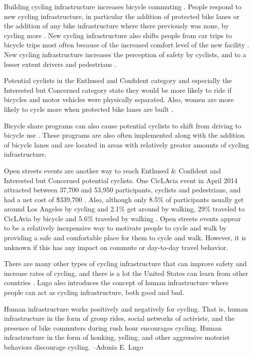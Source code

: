 \documentclass{article}
\begin{document}
Building cycling infrastructure increases bicycle commuting \citep[Page 7]{dill2003}. People respond to new cycling infrastructure, in particular the addition of protected bike lanes or the addition of any bike infrastructure where there previously was none, by cycling more \citep[Page 2174]{pedroso2016} \citep[Page 63]{monsere2014}. New cycling infrastructure also shifts people from car trips to bicycle trips \citep[Page 67]{monsere2014} most often because of the increased comfort level of the new facility \citep[Page 7-9]{mitra2016}. New cycling infrastructure increases the perception of safety by cyclists, and to a lesser extent drivers and pedestrians \citep[Page 105]{monsere2014}.

Potential cyclists in the Enthused and Confident category and especially the Interested but Concerned category state they would be more likely to ride if bicycles and motor vehicles were physically separated. Also, women are more likely to cycle more when protected bike lanes are built \citep[Page 128]{monsere2014}.

Bicycle share programs can also cause potential cyclists to shift from driving to bicycle use
\citep[Page S114]{pucher2010}. These programs are also often implemented along with the addition of bicycle lanes and are located in areas with relatively greater amounts of cycling infrastructure.

Open streets events are another way to reach Enthused \& Confident and Interested but Concerned potential cyclists. One CicLAvia event in April 2014 attracted between 37,700 and 53,950 participants, cyclists and pedestrians, and had a net cost of \$339,700 \citep[Page 30]{cohen2016}. Also, although only 8.5\% of participants usually get around Los Angeles by cycling and 2.1\% get around by walking, 29\% traveled to CicLAvia by bicycle and 5.6\% traveled by walking \citep[Page 29]{cohen2016}. Open streets events appear to be a relatively inexpensive way to motivate people to cycle and walk by providing a safe and comfortable place for them to cycle and walk. However, it is unknown if this has any impact on commute or day-to-day travel behavior.

There are many other types of cycling infrastructure that can improve safety and increase rates of cycling, \citep{pucher2010} and there is a lot the United States can learn from other countries \citep{fhwa2016}. Lugo also introduces the concept of human infrastructure where people can act as cycling infrastructure, both good and bad.
\begin{framed}
\noindent Human infrastructure works positively and negatively for cycling. That is, human infrastructure in the form of group rides, social networks of activists, and the presence of bike commuters during rush hour encourages cycling. Human infrastructure in the form of honking, yelling, and other aggressive motorist behaviors discourage cycling. --Adonia E. Lugo \citep[Page 206]{lugo2013}
\end{framed}
\end{document}
